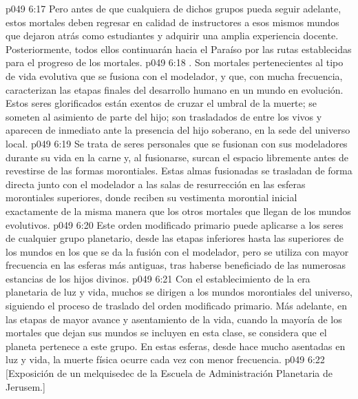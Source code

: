 \vs p049 6:17 Pero antes de que cualquiera de dichos grupos pueda seguir adelante, estos mortales deben regresar en calidad de instructores a esos mismos mundos que dejaron atrás como estudiantes y adquirir una amplia experiencia docente. Posteriormente, todos ellos continuarán hacia el Paraíso por las rutas establecidas para el progreso de los mortales.
\vs p049 6:18 . Son mortales pertenecientes al tipo de vida evolutiva que se fusiona con el modelador, y que, con mucha frecuencia, caracterizan las etapas finales del desarrollo humano en un mundo en evolución. Estos seres glorificados están exentos de cruzar el umbral de la muerte; se someten al asimiento de parte del hijo; son trasladados de entre los vivos y aparecen de inmediato ante la presencia del hijo soberano, en la sede del universo local.
\vs p049 6:19 Se trata de seres personales que se fusionan con sus modeladores durante su vida en la carne y, al fusionarse, surcan el espacio libremente antes de revestirse de las formas morontiales. Estas almas fusionadas se trasladan de forma directa junto con el modelador a las salas de resurrección en las esferas morontiales superiores, donde reciben su vestimenta morontial inicial exactamente de la misma manera que los otros mortales que llegan de los mundos evolutivos.
\vs p049 6:20 Este orden modificado primario puede aplicarse a los seres de cualquier grupo planetario, desde las etapas inferiores hasta las superiores de los mundos en los que se da la fusión con el modelador, pero se utiliza con mayor frecuencia en las esferas más antiguas, tras haberse beneficiado de las numerosas estancias de los hijos divinos.
\vs p049 6:21 Con el establecimiento de la era planetaria de luz y vida, muchos se dirigen a los mundos morontiales del universo, siguiendo el proceso de traslado del orden modificado primario. Más adelante, en las etapas de mayor avance y asentamiento de la vida, cuando la mayoría de los mortales que dejan sus mundos se incluyen en esta clase, se considera que el planeta pertenece a este grupo. En estas esferas, desde hace mucho asentadas en luz y vida, la muerte física ocurre cada vez con menor frecuencia.
\vsetoff
\vs p049 6:22 [Exposición de un melquisedec de la Escuela de Administración Planetaria de Jerusem.]
